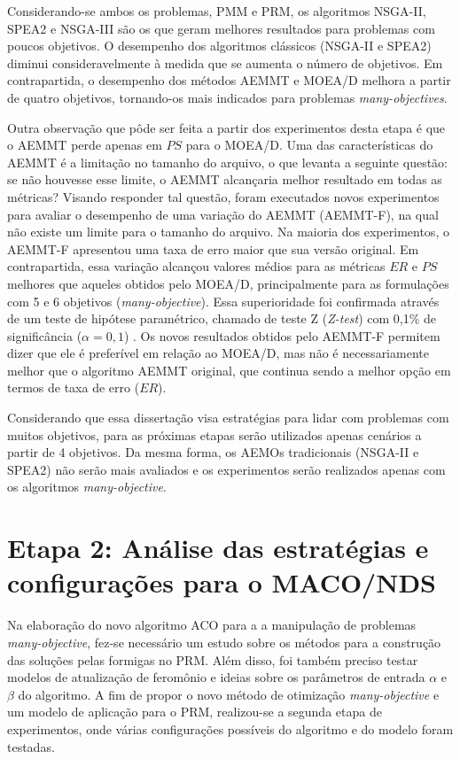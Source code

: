 Considerando-se ambos os problemas, PMM e PRM, os algoritmos NSGA-II, SPEA2 e NSGA-III são os que geram melhores resultados para problemas com poucos objetivos. O desempenho dos algoritmos clássicos (NSGA-II e SPEA2) diminui consideravelmente à medida que se aumenta o número de objetivos. Em contrapartida, o desempenho dos métodos AEMMT e MOEA/D melhora a partir de quatro objetivos, tornando-os mais indicados para problemas \textit{many-objectives}.

Outra observação que pôde ser feita a partir dos experimentos desta etapa é que o AEMMT perde apenas em $PS$ para o MOEA/D. Uma das características do AEMMT é a limitação no tamanho do arquivo, o que levanta a seguinte questão: se não houvesse esse limite, o AEMMT alcançaria melhor resultado em todas as métricas? Visando responder tal questão, foram executados novos experimentos para avaliar o desempenho de uma variação do AEMMT (AEMMT-F), na qual não existe um limite para o tamanho do arquivo. Na maioria dos experimentos, o AEMMT-F apresentou uma taxa de erro maior que sua versão original. Em contrapartida, essa variação alcançou valores médios para as métricas $ER$ e $PS$ melhores que aqueles obtidos pelo MOEA/D, principalmente para as formulações com 5 e 6 objetivos (\textit{many-objective}). Essa superioridade foi confirmada através de um teste de hipótese paramétrico, chamado de teste Z (\textit{Z-test}) com 0,1\% de significância ($\alpha = 0,1$) \cite{Franca2018}. Os novos resultados obtidos pelo AEMMT-F permitem dizer que ele é preferível em relação ao MOEA/D, mas não é necessariamente melhor que o algoritmo AEMMT original, que continua sendo a melhor opção em termos de taxa de erro ($ER$). 

Considerando que essa dissertação visa estratégias para lidar com problemas com muitos objetivos, para as próximas etapas serão utilizados apenas cenários a partir de 4 objetivos. Da mesma forma, os AEMOs tradicionais (NSGA-II e SPEA2) não serão mais avaliados e os experimentos serão realizados apenas com os algoritmos \textit{many-objective}.

\section{Etapa 2: Análise das estratégias e configurações para o MACO/NDS}
\label{section_experimentos_etapa2}

Na elaboração do novo algoritmo ACO para a a manipulação de problemas \textit{many-objective}, fez-se necessário um estudo sobre os métodos para a construção das soluções pelas formigas no PRM. Além disso, foi também preciso testar modelos de atualização de feromônio e ideias sobre os parâmetros de entrada $\alpha$ e $\beta$ do algoritmo. A fim de propor o novo método de otimização \textit{many-objective} e um modelo de aplicação para o PRM, realizou-se a segunda etapa de experimentos, onde várias configurações possíveis do algoritmo e do modelo foram testadas.

